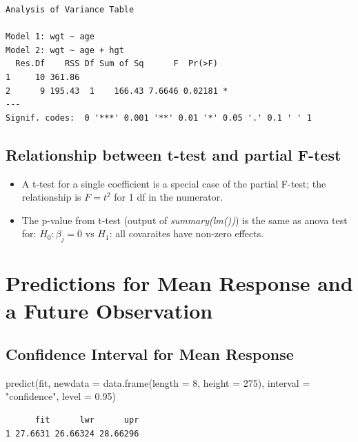 \documentclass[
  letterpaper,
]{scrbook}
\newenvironment{Shaded}{\begin{snugshade}}{\end{snugshade}}
\newcommand{\AttributeTok}[1]{\textcolor[rgb]{0.40,0.45,0.13}{#1}}
\newcommand{\DecValTok}[1]{\textcolor[rgb]{0.68,0.00,0.00}{#1}}
\newcommand{\FloatTok}[1]{\textcolor[rgb]{0.68,0.00,0.00}{#1}}
\newcommand{\FunctionTok}[1]{\textcolor[rgb]{0.28,0.35,0.67}{#1}}
\newcommand{\NormalTok}[1]{\textcolor[rgb]{0.00,0.23,0.31}{#1}}
\newcommand{\StringTok}[1]{\textcolor[rgb]{0.13,0.47,0.30}{#1}}
\providecommand{\tightlist}{%
  \setlength{\itemsep}{0pt}\setlength{\parskip}{0pt}}\usepackage{longtable,booktabs,array}
\begin{document}
\begin{verbatim}
Analysis of Variance Table

Model 1: wgt ~ age
Model 2: wgt ~ age + hgt
  Res.Df    RSS Df Sum of Sq      F  Pr(>F)  
1     10 361.86                              
2      9 195.43  1    166.43 7.6646 0.02181 *
---
Signif. codes:  0 '***' 0.001 '**' 0.01 '*' 0.05 '.' 0.1 ' ' 1
\end{verbatim}

\subsection{Relationship between t-test and partial
F-test}\label{relationship-between-t-test-and-partial-f-test}

\begin{itemize}
\tightlist
\item
  A t-test for a single coefficient is a special case of the partial
  F-test; the relationship is \(F = t^2\) for 1 df in the numerator.
\item
  The p-value from t-test (output of \emph{summary(lm())}) is the same
  as anova test for: \(H_0: \beta_j = 0\) vs \(H_1\): all covaraites
  have non-zero effects.
\end{itemize}

\section{Predictions for Mean Response and a Future
Observation}\label{predictions-for-mean-response-and-a-future-observation}

\subsection{Confidence Interval for Mean
Response}\label{confidence-interval-for-mean-response}

\begin{Shaded}
\begin{Highlighting}[]
\FunctionTok{predict}\NormalTok{(fit, }\AttributeTok{newdata =} \FunctionTok{data.frame}\NormalTok{(}\AttributeTok{length =} \DecValTok{8}\NormalTok{, }\AttributeTok{height =} \DecValTok{275}\NormalTok{),}
        \AttributeTok{interval =} \StringTok{"confidence"}\NormalTok{, }\AttributeTok{level =} \FloatTok{0.95}\NormalTok{)}
\end{Highlighting}
\end{Shaded}

\begin{verbatim}
      fit      lwr      upr
1 27.6631 26.66324 28.66296
\end{verbatim}
\end{document}
